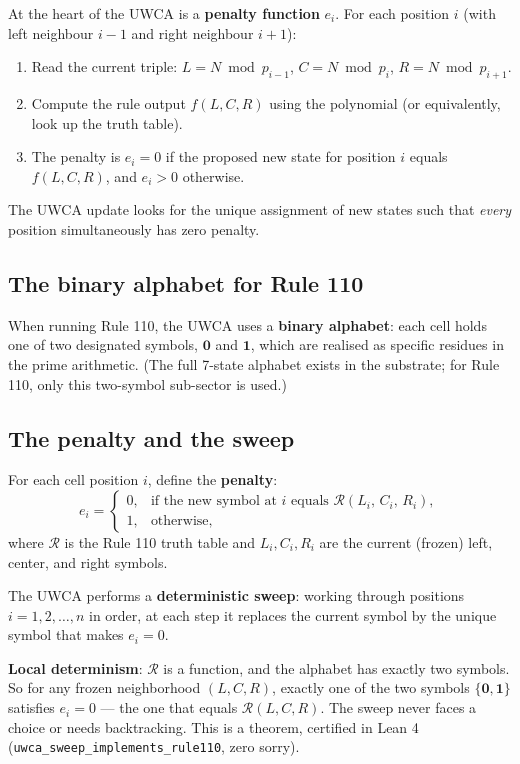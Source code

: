 \documentclass[11pt,a4paper]{article}
\newcommand{\term}[1]{\textbf{#1}}
\begin{document}
At the heart of the UWCA is a \term{penalty function} $e_i$.  For each
position $i$ (with left neighbour $i-1$ and right neighbour $i+1$):

\begin{enumerate}
  \item Read the current triple: $L = N \bmod p_{i-1}$,\;
        $C = N \bmod p_i$,\; $R = N \bmod p_{i+1}$.
  \item Compute the rule output $f(L, C, R)$ using the polynomial
        (or equivalently, look up the truth table).
  \item The penalty is $e_i = 0$ if the proposed new state for position $i$
        equals $f(L, C, R)$, and $e_i > 0$ otherwise.
\end{enumerate}

The UWCA update looks for the unique assignment of new states such that
\emph{every} position simultaneously has zero penalty.

\subsection{The binary alphabet for Rule 110}

When running Rule 110, the UWCA uses a \term{binary alphabet}: each cell
holds one of two designated symbols, $\mathbf{0}$ and $\mathbf{1}$, which
are realised as specific residues in the prime arithmetic.  (The full 7-state
alphabet exists in the substrate; for Rule 110, only this two-symbol
sub-sector is used.)

\subsection{The penalty and the sweep}

For each cell position $i$, define the \term{penalty}:
\[
  e_i =
  \begin{cases}
    0, & \text{if the new symbol at } i \text{ equals }
         \mathcal{R}(L_i,\, C_i,\, R_i), \\
    1, & \text{otherwise,}
  \end{cases}
\]
where $\mathcal{R}$ is the Rule 110 truth table and $L_i, C_i, R_i$ are the
current (frozen) left, center, and right symbols.

The UWCA performs a \term{deterministic sweep}: working through positions
$i = 1, 2, \ldots, n$ in order, at each step it replaces the current symbol
by the unique symbol that makes $e_i = 0$.

\begin{tcolorbox}[colback=boxpurple,colframe=purple!50!black,title=Why the sweep is well-defined]
\term{Local determinism}: $\mathcal{R}$ is a function, and the alphabet has
exactly two symbols.  So for any frozen neighborhood $(L, C, R)$, exactly
one of the two symbols $\{\mathbf{0}, \mathbf{1}\}$ satisfies $e_i = 0$ —
the one that equals $\mathcal{R}(L, C, R)$.  The sweep never faces a choice
or needs backtracking.  This is a theorem, certified in Lean 4
(\texttt{uwca\_sweep\_implements\_rule110}, zero sorry).
\end{tcolorbox}
\end{document}
